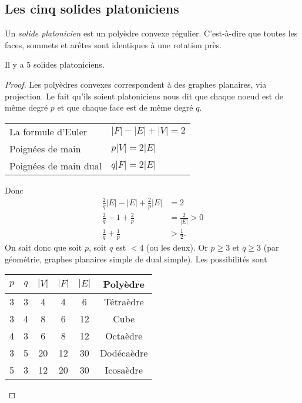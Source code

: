 \subsection{Les cinq solides platoniciens}
\begin{mydef}
  Un \emph{solide platonicien} est un polyèdre convexe régulier.
  C'est-à-dire que toutes les faces, sommets et arêtes sont identiques à une rotation près.
\end{mydef}

\begin{mytheo}
  Il y a 5 solides platoniciens.
  \begin{proof}
    Les polyèdres convexes correspondent à des graphes planaires, via projection.
    Le fait qu'ils soient platoniciens nous dit que chaque noeud est de même degré $p$ et que chaque face est de même degré $q$.
    \begin{center}
      \begin{tabular}{ll}
        La formule d'Euler & $|F| - |E| + |V| = 2$\\
        Poignées de main & $p|V| = 2|E|$\\
        Poignées de main dual & $q|F| = 2|E|$
      \end{tabular}
    \end{center}
    Donc
    \begin{align*}
      \frac{2}{q}|E| - |E| + \frac{2}{p} |E| & = 2\\
      \frac{2}{q} - 1 + \frac{2}{p} & = \frac{2}{|E|} > 0\\
      \frac{1}{q} + \frac{1}{p} & > \frac{1}{2}.
    \end{align*}
    On sait donc que soit $p$, soit $q$ est $< 4$ (ou les deux).
    Or $p \geq 3$ et $q \geq 3$ (par géométrie, graphes planaires simple de dual simple).
    Les possibilités sont
    \begin{center}
      \begin{tabular}{|c|c|c|c|c|c|}
        \hline
        $p$ & $q$ & $|V|$ & $|F|$ & $|E|$ & Polyèdre\\
        \hline
         3  &  3  &   4   &   4   &   6   & Tétraèdre\\
         3  &  4  &   8   &   6   &  12   & Cube\\
         4  &  3  &   6   &   8   &  12   & Octaèdre\\
         3  &  5  &  20   &  12   &  30   & Dodécaèdre\\
         5  &  3  &  12   &  20   &  30   & Icosaèdre\\
        \hline
      \end{tabular}
    \end{center}
  \end{proof}
\end{mytheo}

